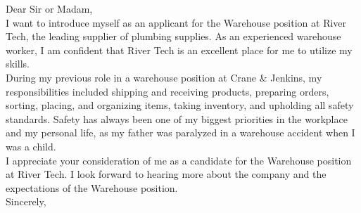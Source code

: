 \subject{Application as Warehouse Assistant at River Tech}
\coverletter[sender=true, vspace=4mm]

Dear Sir or Madam,\\

I want to introduce myself as an applicant for the Warehouse position at River Tech, the leading supplier of plumbing supplies. As an experienced warehouse worker, I am confident that River Tech is an excellent place for me to utilize my skills. \\

During my previous role in a warehouse position at Crane \& Jenkins, my responsibilities included shipping and receiving products, preparing orders, sorting, placing, and organizing items, taking inventory, and upholding all safety standards. Safety has always been one of my biggest priorities in the workplace and my personal life, as my father was paralyzed in a warehouse accident when I was a child.\\

I appreciate your consideration of me as a candidate for the Warehouse position at River Tech. I look forward to hearing more about the company and the expectations of the Warehouse position.\\

Sincerely, 
